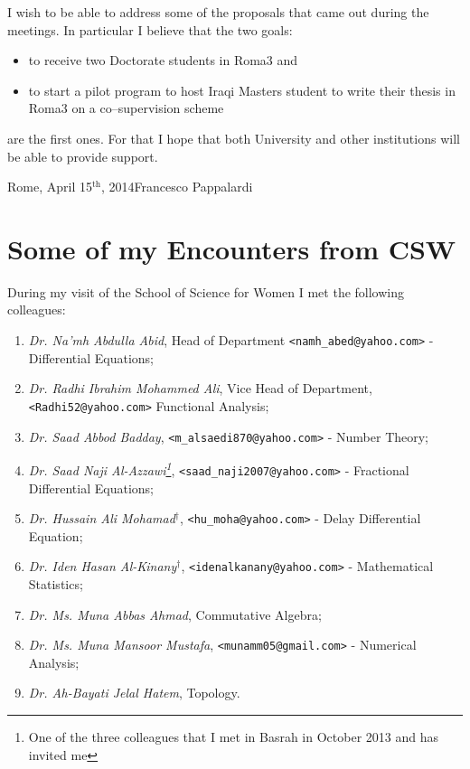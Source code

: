\documentclass[12pt,a4paper]{scrartcl}
\begin{document}
I wish to be able to address some of the proposals that came out during the meetings. In particular I believe that the two goals:  
\begin{itemize}
 \item[\textborn] to receive two Doctorate students in Roma3 and 
 \item[\textborn] to start a pilot program to host Iraqi Masters student to write their thesis in Roma3 on a co--supervision scheme
\end{itemize}
are the first ones. For that I hope that both University and other institutions will be able to provide support.
\bigskip
\vfill

Rome, April 15$^{\textrm{th}}$, 2014\hfill Francesco Pappalardi
 \newpage

\section{Some of my Encounters from CSW}

During my visit of the School of Science for Women I met the following colleagues:
\begin{enumerate}
\item \textsl{Dr. Na'mh Abdulla Abid}, Head of Department \texttt{<namh\_abed@yahoo.com>} - Differential Equations;
\item \textsl{Dr. Radhi Ibrahim Mohammed Ali}, Vice Head of Department, \texttt{<Radhi52@yahoo.com>} Functional Analysis; 
\item \textsl{Dr. Saad Abbod Badday}, \texttt{<m\_alsaedi870@yahoo.com>} -  Number Theory; 
\item \textsl{Dr. Saad Naji Al-Azzawi\footnote{One of the three colleagues that I met in Basrah in October 2013 and has invited me}}, 
\texttt{<saad\_naji2007@yahoo.com>} - Fractional Differential Equations; 
\item \textsl{Dr. Hussain Ali Mohamad$^\dag$}, \texttt{<hu\_moha@yahoo.com>} - Delay Differential Equation;
\item \textsl{Dr. Iden Hasan Al-Kinany$^\dag$}, \texttt{<idenalkanany@yahoo.com>} - Mathematical Statistics;
\item \textsl{Dr. Ms. Muna Abbas Ahmad}, Commutative Algebra;
\item \textsl{Dr. Ms. Muna Mansoor Mustafa}, \texttt{<munamm05@gmail.com>} - Numerical Analysis;   
\item \textsl{Dr. Ah-Bayati Jelal Hatem}, Topology.
\end{enumerate}
\end{document}
